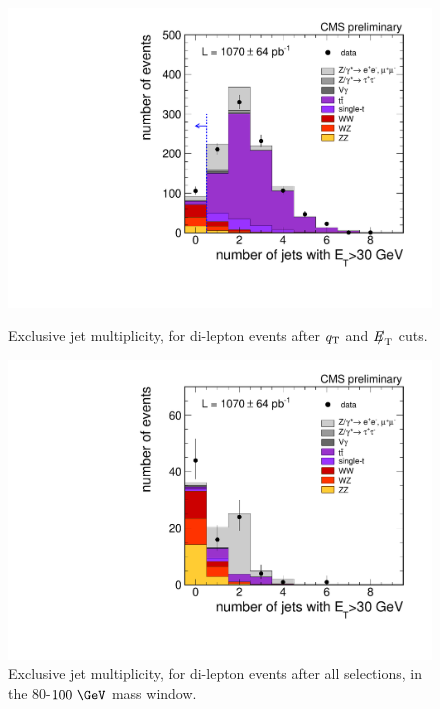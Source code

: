 \begin{figure}[bt]
\begin{minipage}[t]{0.48\linewidth}
\centering
\includegraphics[width=1\linewidth]{figures/ZZ_2l2n/jMult_q30_met.pdf}
\caption{Exclusive jet multiplicity, for di-lepton events after $q_{\mathrm{T}}$ and ${E\!\!\!/}_{\mathrm{T}}$ cuts. \label{fig:ZZ_2l2n_jMult_q30_met}}
\end{minipage}
\hspace{0.5cm}
\begin{minipage}[t]{0.48\linewidth}
\centering
\includegraphics[width=1\linewidth]{figures/ZZ_2l2n/jMult_final.pdf}
\caption{Exclusive jet multiplicity, for di-lepton events after all selections, in the $80$-$100~\GeV$ mass window. \label{fig:ZZ_2l2n_jMult_final}}
\end{minipage}
\end{figure}

